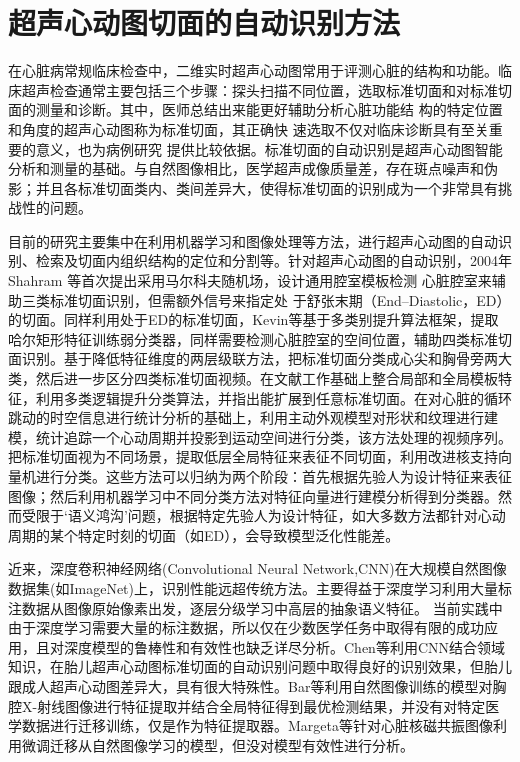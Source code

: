 \chapter{超声心动图切面的自动识别方法}
\label{chap:classification}

在心脏病常规临床检查中，二维实时超声心动图常用于评测心脏的结构和功能。临床超声检查通常主要包括三个步骤：探头扫描不同位置，选取标准切面和对标准切面的测量和诊断\citep{Chen2015}。其中，医师总结出来能更好辅助分析心脏功能结 构的特定位置和角度的超声心动图称为标准切面，其正确快 速选取不仅对临床诊断具有至关重要的意义，也为病例研究 提供比较依据。标准切面的自动识别是超声心动图智能分析和测量的基础。与自然图像相比，医学超声成像质量差，存在斑点噪声和伪影；并且各标准切面类内、类间差异大，使得标准切面的识别成为一个非常具有挑战性的问题。

目前的研究主要集中在利用机器学习和图像处理等方法，进行超声心动图的自动识别、检索及切面内组织结构的定位和分割等。针对超声心动图的自动识别，2004年Shahram 等\citep{Ebadollahi2004}首次提出采用马尔科夫随机场，设计通用腔室模板检测 心脏腔室来辅助三类标准切面识别，但需额外信号来指定处 于舒张末期（End–Diastolic，ED）的切面。同样利用处于ED的标准切面，Kevin等\citep{KevinZhou2006}基于多类别提升算法框架，提取哈尔矩形特征训练弱分类器，同样需要检测心脏腔室的空间位置，辅助四类标准切面识别。基于降低特征维度的两层级联方法，把标准切面分类成心尖和胸骨旁两大类，然后进一步区分四类标准切面视频\citep{Otey2006,Roy2006b}。在文献工作基础上整合局部和全局模板特征，利用多类逻辑提升分类算法，并指出能扩展到任意标准切面\citep{Park2007a}。在对心脏的循环跳动的时空信息进行统计分析的基础上，利用主动外观模型对形状和纹理进行建模，统计追踪一个心动周期并投影到运动空间进行分类\citep{Beymer2008}，该方法处理的视频序列。把标准切面视为不同场景，提取低层全局特征来表征不同切面，利用改进核支持向量机进行分类\citep{Wu2014c}。这些方法可以归纳为两个阶段：首先根据先验人为设计特征来表征图像；然后利用机器学习中不同分类方法对特征向量进行建模分析得到分类器。然而受限于‘语义鸿沟’问题，根据特定先验人为设计特征，如大多数方法都针对心动周期的某个特定时刻的切面（如ED），会导致模型泛化性能差。

近来，深度卷积神经网络(Convolutional Neural Network,CNN)在大规模自然图像数据集(如ImageNet\citep{Russakovsky})上，识别性能远超传统方法\citep{Krizhevsky2012}。主要得益于深度学习利用大量标注数据从图像原始像素出发，逐层分级学习中高层的抽象语义特征\citep{Sharif2014}。
当前实践中由于深度学习需要大量的标注数据，所以仅在少数医学任务中取得有限的成功应用，且对深度模型的鲁棒性和有效性也缺乏详尽分析。Chen等\citep{Chen2015}利用CNN结合领域知识，在胎儿超声心动图标准切面的自动识别问题中取得良好的识别效果，但胎儿跟成人超声心动图差异大，具有很大特殊性。Bar等\citep{Bar2015Chest}利用自然图像训练的模型对胸腔X-射线图像进行特征提取并结合全局特征\citep{Oliva2001}得到最优检测结果，并没有对特定医学数据进行迁移训练，仅是作为特征提取器。Margeta等\citep{Margeta2015}针对心脏核磁共振图像利用微调迁移从自然图像学习的模型，但没对模型有效性进行分析。

